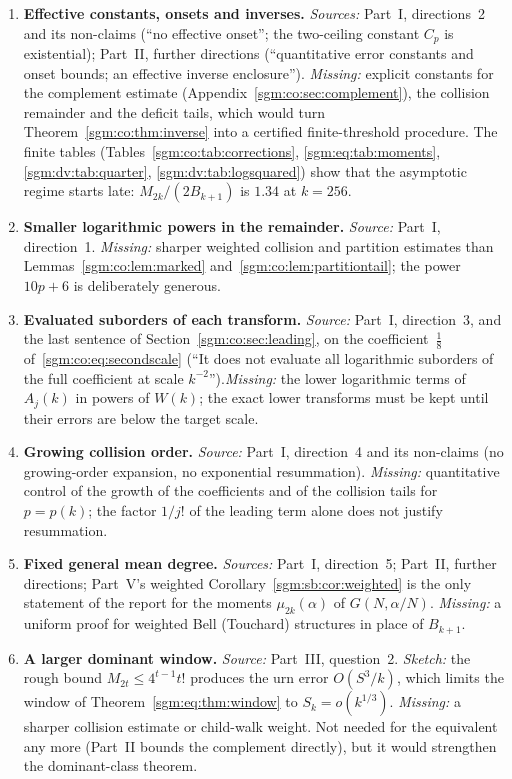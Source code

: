 \documentclass[11pt,letterpaper]{article}
\theoremstyle{remark}\newtheorem{remark}[theorem]{Remark}
\theoremstyle{definition}\newtheorem{definition}[theorem]{Definition}
\begin{document}
\begin{enumerate}
\item\label{sgm:q:effective} \textbf{Effective constants, onsets and inverses.} \emph{Sources:} Part~I, directions~2 and its non-claims (``no effective onset''; the two-ceiling constant $C_p$ is existential); Part~II, further directions (``quantitative error constants and onset bounds; an effective inverse enclosure''). \emph{Missing:} explicit constants for the complement estimate (Appendix~\ref{sgm:co:sec:complement}), the collision remainder and the deficit tails, which would turn Theorem~\ref{sgm:co:thm:inverse} into a certified finite-threshold procedure. The finite tables (Tables~\ref{sgm:co:tab:corrections}, \ref{sgm:eq:tab:moments}, \ref{sgm:dv:tab:quarter}, \ref{sgm:dv:tab:logsquared}) show that the asymptotic regime starts late: $M_{2k}/(2B_{k+1})$ is $1.34$ at $k=256$.
\item\label{sgm:q:logpowers} \textbf{Smaller logarithmic powers in the remainder.} \emph{Source:} Part~I, direction~1. \emph{Missing:} sharper weighted collision and partition estimates than Lemmas~\ref{sgm:co:lem:marked} and~\ref{sgm:co:lem:partitiontail}; the power $10p+6$ is deliberately generous.
\item\label{sgm:q:suborders} \textbf{Evaluated suborders of each transform.} \emph{Source:} Part~I, direction~3, and the last sentence of Section~\ref{sgm:co:sec:leading}, on the coefficient~$\frac18$ of~\eqref{sgm:co:eq:secondscale} (``It does not evaluate all logarithmic suborders of the full coefficient at scale $k^{-2}$'').\emph{Missing:} the lower logarithmic terms of $A_j(k)$ in powers of $W(k)$; the exact lower transforms must be kept until their errors are below the target scale.
\item\label{sgm:q:growing} \textbf{Growing collision order.} \emph{Source:} Part~I, direction~4 and its non-claims (no growing-order expansion, no exponential resummation). \emph{Missing:} quantitative control of the growth of the coefficients and of the collision tails for $p=p(k)$; the factor $1/j!$ of the leading term alone does not justify resummation.
\item\label{sgm:q:meandegree} \textbf{Fixed general mean degree.} \emph{Sources:} Part~I, direction~5; Part~II, further directions; Part~V's weighted Corollary~\ref{sgm:sb:cor:weighted} is the only statement of the report for the moments $\mu_{2k}(\alpha)$ of $G(N,\alpha/N)$. \emph{Missing:} a uniform proof for weighted Bell (Touchard) structures in place of $B_{k+1}$.
\item\label{sgm:q:window} \textbf{A larger dominant window.} \emph{Source:} Part~III, question~2. \emph{Sketch:} the rough bound $M_{2t}\le4^{t-1}t!$ produces the urn error $O(S^3/k)$, which limits the window of Theorem~\ref{sgm:eq:thm:window} to $S_k=o(k^{1/3})$. \emph{Missing:} a sharper collision estimate or child-walk weight. Not needed for the equivalent any more (Part~II bounds the complement directly), but it would strengthen the dominant-class theorem.

\end{enumerate}
\end{document}
